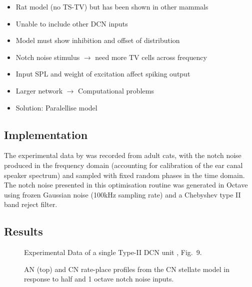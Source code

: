 \begin{itemize}
\item Rat model (no TS-TV) but has been shown in other mammals
\item Unable to include other DCN inputs
\item Model must show \DSTV inhibition and offset of distribution


\item Notch noise stimulus $\rightarrow$ need more TV cells across
  frequency
\item Input SPL and weight of excitation affect spiking output
\item Larger network $\rightarrow$ Computational problems
\item Solution: Paralellise model
\end{itemize}


\subsection{Implementation}

The experimental data by \citet{ReissYoung:2005} was recorded from adult cats,
with the notch noise produced in the frequency domain (accounting for
calibration of the ear canal speaker spectrum) and sampled with fixed random
phases in the time domain. The notch noise presented in this optimisation
routine was generated in Octave using frozen Gaussian noise (100kHz sampling
rate) and a Chebyshev type II band reject filter.



\clearpage
\subsection{Results} 

\begin{figure}[htb]
  \centering
{}
\caption{Experimental Data of a single Type-II DCN unit \citep{ReissYoung:2005}, Fig.~9.}
  \label{fig:TVReissFig9}
\end{figure}


\begin{figure}[tbh]
  \centering
\caption{AN (top) and CN rate-place profiles from the CN stellate
  model in response to half and 1 octave notch noise inputs. }
\label{fig:TVResults}
\end{figure}


